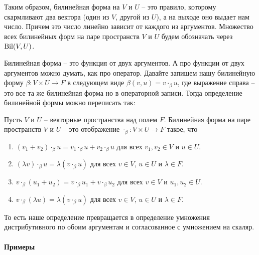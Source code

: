 Таким образом, билинейная форма на $V$ и $U$ -- это правило, которому скармливают два вектора (один из $V$, другой из $U$), а на выходе оно выдает нам число.
Причем это число линейно зависит от каждого из аргументов.
Множество всех билинейных форм на паре пространств $V$ и $U$ будем обозначать через $\operatorname{Bil}(V,U)$.

Билинейная форма -- это функция от двух аргументов.
А про функции от двух аргументов можно думать, как про оператор.
Давайте запишем нашу билинейную форму $\beta\colon V\times U \to F$ в следующем виде $\beta(v,u) = v \cdot_\beta u$, где выражение справа -- это все та же билинейная форма но в операторной записи.
Тогда определение билинейной формы можно переписать так:
\begin{definition}
Пусть $V$ и $U$ -- векторные пространства над полем $F$.
Билинейная форма на паре пространств $V$ и $U$ -- это отображение $\cdot_\beta\colon V\times U \to F$ такое, что
\begin{enumerate}
\item $(v_1 + v_2)\cdot_\beta u = v_1\cdot_\beta u + v_2\cdot_\beta u$ для всех $v_1,v_2\in V$ и $u\in U$.

\item $(\lambda v)\cdot_\beta u = \lambda (v\cdot_\beta u)$ для всех $v\in V$, $u\in U$ и $\lambda\in F$.

\item $v\cdot_\beta( u_1+u_2) = v\cdot_\beta u_1 + v\cdot_\beta u_2$ для всех $v\in V$ и $u_1,u_2\in U$.

\item $v\cdot_\beta(\lambda u) = \lambda (v\cdot_\beta u)$ для всех $v\in V$, $u\in U$ и $\lambda\in F$.
\end{enumerate}
\end{definition}

То есть наше определение превращается в определение умножения дистрибутивного по обоим аргументам и согласованное с умножением на скаляр.

\paragraph{Примеры}

